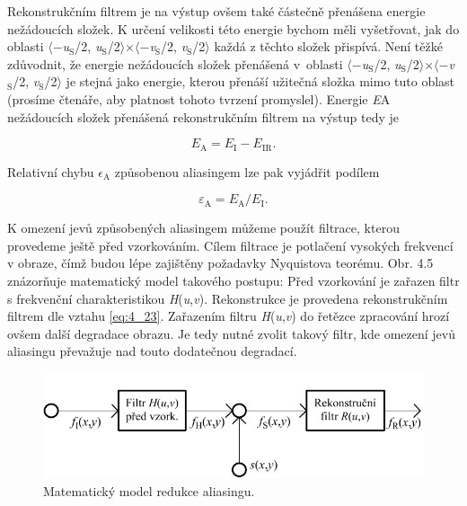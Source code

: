 Rekonstrukčním filtrem je na výstup ovšem také částečně přenášena energie nežádoucích složek. K určení velikosti této energie bychom měli vyšetřovat, jak do oblasti $\langle$$-$\textit{u}$_\mathrm{S}$/2, \textit{u}$_\mathrm{S}$/2$\rangle$$\times$$\langle$$-$\textit{v}$_\mathrm{S}$/2, \textit{v}$_\mathrm{S}$/2$\rangle$ každá z těchto složek přispívá. Není těžké zdůvodnit, že energie nežádoucích složek přenášená v~oblasti $\langle$$-$\textit{u}$_\mathrm{S}$/2, \textit{u}$_\mathrm{S}$/2$\rangle$$\times$$\langle$$-$\textit{v}$_\mathrm{S}$/2, \textit{v}$_\mathrm{S}$/2$\rangle$ je stejná jako energie, kterou přenáší užitečná složka mimo tuto oblast (prosíme čtenáře, aby platnost tohoto tvrzení promyslel). Energie \textit{E}A nežádoucích složek přenášená rekonstrukčním filtrem na výstup tedy je

\begin{equation} \label{eq:4_28}
    E_\mathrm{A} = E_\mathrm{I} - E_\mathrm{IR}.
\end{equation}

Relativní chybu $\epsilon_\mathrm{A}$ způsobenou aliasingem lze pak vyjádřit podílem

\begin{equation} \label{eq:4_29}
    \varepsilon_\mathrm{A} = E_\mathrm{A} / E_\mathrm{I}.
\end{equation}

K omezení jevů způsobených aliasingem můžeme použít filtrace, kterou provedeme ještě před vzorkováním. Cílem filtrace je potlačení vysokých frekvencí v obraze, čímž budou lépe zajištěny požadavky Nyquistova teorému. Obr. 4.5 znázorňuje matematický model takového postupu: Před vzorkování je zařazen filtr s frekvenční charakteristikou \textit{H}(\textit{u},\textit{v}). Rekonstrukce je provedena rekonstrukčním filtrem dle vztahu \eqref{eq:4_23}. Zařazením filtru \textit{H}(\textit{u},\textit{v}) do řetězce zpracování hrozí ovšem další degradace obrazu. Je tedy nutné zvolit takový filtr, kde omezení jevů aliasingu převažuje nad touto dodatečnou degradací.

\begin{figure}[th]
    \begin{center}
        \includegraphics[scale=1.0]{04_digitalizace/images/img_4_5.pdf}
    \end{center}
    \caption{Matematický model redukce aliasingu.}
    \label{img:4_5}
\end{figure}

